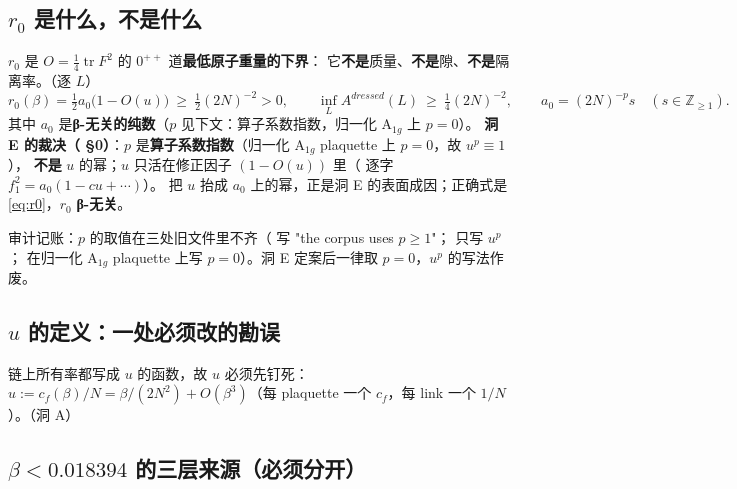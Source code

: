 \subsection{$r_0$ 是什么，不是什么}

$r_0$ 是 $O=\tfrac14\operatorname{tr}F^2$ 的 $0^{++}$ 道\textbf{最低原子重量的下界}：
它\textbf{不是}质量、\textbf{不是}隙、\textbf{不是}隔离率。\LT{}（逐 $L$）
\begin{equation}
r_0(\beta)=\tfrac12a_0\bigl(1-O(u)\bigr)\ \ge\ \tfrac12(2N)^{-2}>0,
\qquad \inf_L A^{dressed}(L)\ \ge\ \tfrac14(2N)^{-2},
\qquad a_0=(2N)^{-p}s\quad(s\in\mathbb{Z}_{\ge1}).
\label{eq:r0}
\end{equation}
其中 $a_0$ 是\textbf{β-无关的纯数}（$p$ 见下文：算子系数指数，归一化 $\mathrm{A}_{1g}$ 上 $p=0$）。
\textbf{洞 E 的裁决（ \S0）}：$p$ 是\textbf{算子系数指数}（归一化 $\mathrm{A}_{1g}$ plaquette 上 $p=0$，故 $u^p\equiv1$），
\textbf{不是} $u$ 的幂；$u$ 只活在修正因子 $(1-O(u))$ 里（ 逐字 $f_1^2=a_0(1-cu+\cdots)$）。
把 $u$ 抬成 $a_0$ 上的幂，正是洞 E 的表面成因；正确式是 \eqref{eq:r0}，$r_0$ \textbf{β-无关}。

\LM{} 审计记账：$p$ 的取值在三处旧文件里不齐（ 写 "the corpus uses $p\ge1$"； 只写 $u^p$；
 在归一化 $\mathrm{A}_{1g}$ plaquette 上写 $p=0$）。洞 E 定案后一律取 $p=0$，$u^p$ 的写法作废。

\subsection{$u$ 的定义：一处必须改的勘误}

链上所有率都写成 $u$ 的函数，故 $u$ 必须先钉死：\textbf{$u:=c_f(\beta)/N=\beta/(2N^2)+O(\beta^3)$}（每 plaquette 一个 $c_f$，每 link 一个 $1/N$）。\LT{}（洞 A）

\subsection{$\beta<0.018394$ 的三层来源（必须分开）}

